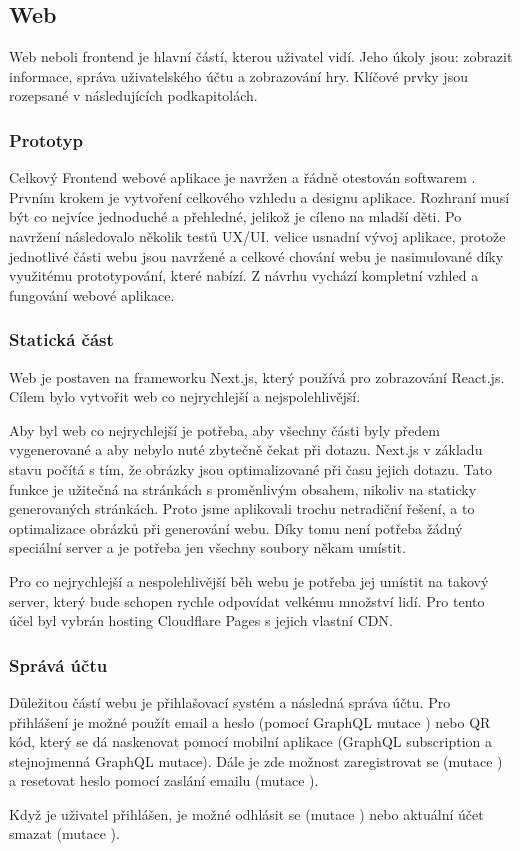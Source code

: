 \subsection{Web}
Web neboli frontend je hlavní částí, kterou uživatel vidí. Jeho úkoly jsou: zobrazit informace, správa uživatelského účtu a zobrazování hry. Klíčové prvky jsou rozepsané v následujících podkapitolách.

\subsubsection{Prototyp}
Celkový Frontend webové aplikace je navržen a řádně otestován softwarem . Prvním krokem je vytvoření celkového vzhledu a designu aplikace. Rozhraní musí být co nejvíce jednoduché a přehledné, jelikož je cíleno na mladší děti. Po navržení následovalo několik testů UX/UI.  velice usnadní vývoj aplikace, protože jednotlivé části webu jsou navržené a celkové chování webu je nasimulované díky využitému prototypování, které  nabízí. Z návrhu vychází kompletní vzhled a fungování webové aplikace.

\subsubsection{Statická část}
Web je postaven na frameworku Next.js, který používá pro zobrazování React.js. Cílem bylo vytvořit web co nejrychlejší a nejspolehlivější.\par
Aby byl web co nejrychlejší je potřeba, aby všechny části byly předem vygenerované a aby nebylo nuté zbytečně čekat při dotazu. Next.js v základu stavu počítá s tím, že obrázky jsou optimalizované při času jejich dotazu. Tato funkce je užitečná na stránkách s proměnlivým obsahem, nikoliv na staticky generovaných stránkách. Proto jsme aplikovali trochu netradiční řešení, a to optimalizace obrázků při generování webu. Díky tomu není potřeba žádný speciální server a je potřeba jen všechny soubory někam umístit.\par
Pro co nejrychlejší a nespolehlivější běh webu je potřeba jej umístit na takový server, který bude schopen rychle odpovídat velkému množství lidí. Pro tento účel byl vybrán hosting Cloudflare Pages\cite{Cloudflare-pages} s jejich vlastní CDN\cite{Cloudflare-cdn}. 

\subsubsection{Správá účtu}
Důležitou částí webu je přihlašovací systém a následná správa účtu. Pro přihlášení je možné použít email a heslo (pomocí GraphQL mutace ) nebo QR kód, který se dá naskenovat pomocí mobilní aplikace (GraphQL subscription  a stejnojmenná GraphQL mutace). Dále je zde možnost zaregistrovat se (mutace ) a resetovat heslo pomocí zaslání emailu (mutace ).\par
Když je uživatel přihlášen, je možné odhlásit se (mutace ) nebo aktuální účet smazat (mutace ).

